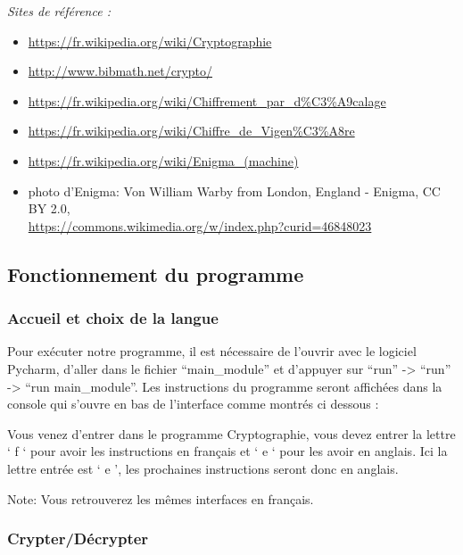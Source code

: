 \documentclass[a4paper,12pt,abstracton,titlepage]{scrartcl}
\begin{document}
\textit{Sites de référence :}
\begin{itemize}
\item \url{https://fr.wikipedia.org/wiki/Cryptographie}
\item \url{http://www.bibmath.net/crypto/}
\item \url{https://fr.wikipedia.org/wiki/Chiffrement_par_d\%C3\%A9calage}
\item \url{https://fr.wikipedia.org/wiki/Chiffre_de_Vigen\%C3\%A8re}
\item \url{https://fr.wikipedia.org/wiki/Enigma_(machine)}
\item photo d’Enigma:
Von William Warby from London, England - Enigma, CC BY 2.0,\\\url{https://commons.wikimedia.org/w/index.php?curid=46848023}\\
\end{itemize}

\newpage
\subsection{Fonctionnement du programme}

\subsubsection{Accueil et choix de la langue}
Pour exécuter notre programme, il est nécessaire de l'ouvrir avec le logiciel Pycharm, d'aller dans le fichier "`main\_module"' et d'appuyer sur "`run"' -> "`run"' -> "`run main\_module"'.
Les instructions du programme seront affichées dans la console qui s'ouvre en bas de l'interface comme montrés ci dessous :

{
	\label{SP}
}

Vous venez d’entrer dans le programme Cryptographie, vous devez entrer la lettre ‘ f ‘ pour avoir les instructions en français et ‘ e ‘ pour les avoir en anglais.
Ici la lettre entrée est ‘ e ’, les prochaines instructions seront donc en anglais. 

Note: Vous retrouverez les mêmes interfaces en français.



\subsubsection{Crypter/Décrypter}
\end{document}
